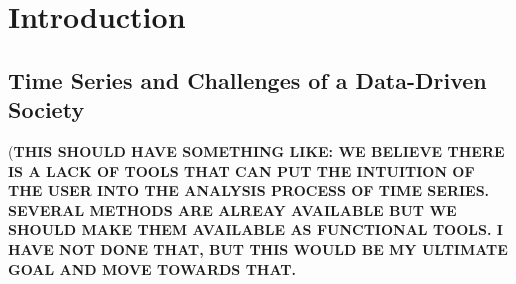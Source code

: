 
%

\chapter{Introduction}
\label{cha:introduction}



\section{Time Series and Challenges of a Data-Driven Society} 
\label{sub:motivation1}


(\textbf{THIS SHOULD HAVE SOMETHING LIKE: WE BELIEVE THERE IS A LACK OF TOOLS THAT CAN PUT THE INTUITION OF THE USER INTO THE ANALYSIS PROCESS OF TIME SERIES. SEVERAL METHODS ARE ALREAY AVAILABLE BUT WE SHOULD MAKE THEM AVAILABLE AS FUNCTIONAL TOOLS. I HAVE NOT DONE THAT, BUT THIS WOULD BE MY ULTIMATE GOAL AND MOVE TOWARDS THAT.}

